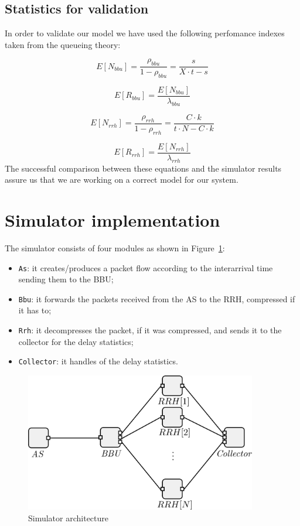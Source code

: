\documentclass[11pt,a4paper,oneside, openright]{article}
\begin{document}
\subsection{Statistics for validation}
In order to validate our model we have used the following perfomance indexes taken from the queueing theory:

$$ E[N_{bbu}] = \frac{\rho_{bbu}}{1 - \rho_{bbu}} = \frac{s}{X \cdot t - s}$$

$$ E[R_{bbu}] = \frac{E[N_{bbu}]}{\lambda_{bbu}} $$

$$ E[N_{rrh}] = \frac{\rho_{rrh}}{1 - \rho_{rrh}} = \frac{C \cdot k}{t \cdot N - C \cdot k}$$

$$ E[R_{rrh}] = \frac{E[N_{rrh}]}{\lambda_{rrh}} $$
The successful comparison between these equations and the simulator results assure us that we are working on a correct model for our system.

\section{Simulator implementation}
The simulator consists of four modules as shown in Figure~\ref{fig:simulator}:
\begin{itemize}
  \item \texttt{As}: it creates/produces a packet flow according to the interarrival time sending them to the BBU;
  \item \texttt{Bbu}: it forwards the packets received from the AS to the RRH, compressed if it has to;
  \item \texttt{Rrh}: it decompresses the packet, if it was compressed, and sends it to the collector for the delay statistics;
  \item \texttt{Collector}: it handles of the delay statistics.
\end{itemize}

\begin{figure}[h]
    \centering
    \includegraphics[width=0.9\textwidth]{images/simulator}
    \caption{Simulator architecture}
    \label{fig:simulator}
\end{figure}
\end{document}
